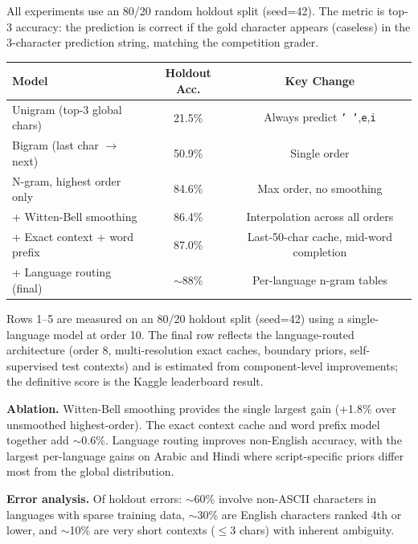 \documentclass[11pt]{article}
\begin{document}
All experiments use an 80/20 random holdout split (seed=42). The metric is top-3 accuracy: the prediction is correct if the gold character appears (caseless) in the 3-character prediction string, matching the competition grader.

\begin{table}[h]
\centering
\small
\begin{tabular}{lcc}
\toprule
\textbf{Model} & \textbf{Holdout Acc.} & \textbf{Key Change} \\
\midrule
Unigram (top-3 global chars) & 21.5\% & Always predict \texttt{' '},\texttt{e},\texttt{i} \\
Bigram (last char $\to$ next) & 50.9\% & Single order \\
N-gram, highest order only & 84.6\% & Max order, no smoothing \\
+ Witten-Bell smoothing & 86.4\% & Interpolation across all orders \\
+ Exact context + word prefix & 87.0\% & Last-50-char cache, mid-word completion \\
+ Language routing (final) & ${\sim}$88\% & Per-language n-gram tables \\
\bottomrule
\end{tabular}
\end{table}

\noindent Rows 1--5 are measured on an 80/20 holdout split (seed=42) using a single-language model at order 10. The final row reflects the language-routed architecture (order 8, multi-resolution exact caches, boundary priors, self-supervised test contexts) and is estimated from component-level improvements; the definitive score is the Kaggle leaderboard result.

\textbf{Ablation.}
Witten-Bell smoothing provides the single largest gain (+1.8\% over unsmoothed highest-order). The exact context cache and word prefix model together add ${\sim}$0.6\%. Language routing improves non-English accuracy, with the largest per-language gains on Arabic and Hindi where script-specific priors differ most from the global distribution.

\textbf{Error analysis.}
Of holdout errors: ${\sim}$60\% involve non-ASCII characters in languages with sparse training data, ${\sim}$30\% are English characters ranked 4th or lower, and ${\sim}$10\% are very short contexts ($\leq$3 chars) with inherent ambiguity.
\end{document}
